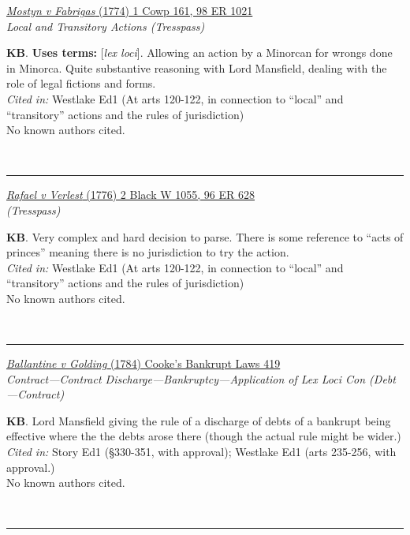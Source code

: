 \documentclass[twoside]{article}
\begin{document}
        \begin{small}
        \begin{center}
        \href{https://heinonline.org/HOL/P?h=hein.engrep/engrf0098&i=1025}{\textit{Mostyn v Fabrigas} (1774) 1 Cowp 161, 98 ER 1021} \label{12} \\ 
\textit{Local and Transitory Actions (Tresspass)}\\
        \end{center}
        \textbf{KB}.  \textbf{Uses terms: }[\textit{lex loci}]. Allowing an action by a Minorcan for wrongs done in Minorca. Quite substantive reasoning with Lord Mansfield, dealing with the role of legal fictions and forms.\\\textit{Cited in: }Westlake Ed1 (At arts 120-122, in connection to “local” and “transitory” actions and the rules of jurisdiction)\\No known authors cited.
        \end{small}\\
        \rule{\textwidth}{0.5pt}
        

        \begin{small}
        \begin{center}
        \href{https://heinonline.org/HOL/P?h=hein.engrep/engrf0096&i=632}{\textit{Rafael v Verlest} (1776) 2 Black W 1055, 96 ER 628} \label{11} \\ 
\textit{ (Tresspass)}\\
        \end{center}
        \textbf{KB}. Very complex and hard decision to parse. There is some reference to “acts of princes” meaning there is no jurisdiction to try the action.\\\textit{Cited in: }Westlake Ed1 (At arts 120-122, in connection to “local” and “transitory” actions and the rules of jurisdiction)\\No known authors cited.
        \end{small}\\
        \rule{\textwidth}{0.5pt}
        

        \begin{small}
        \begin{center}
        \href{https://link.gale.com/apps/doc/CW0125544801/ECCO?u=oxford&sid=gale_marc&xid=19b67222&pg=534}{\textit{Ballantine v Golding} (1784) Cooke’s Bankrupt Laws 419} \label{39} \\ 
\textit{Contract---Contract Discharge---Bankruptcy---Application of Lex Loci Con (Debt---Contract)}\\
        \end{center}
        \textbf{KB}. Lord Mansfield giving the rule of a discharge of debts of a bankrupt being effective where the the debts arose there (though the actual rule might be wider.)\\\textit{Cited in: }Story Ed1 (§330-351, with approval); Westlake Ed1 (arts 235-256, with approval.)\\No known authors cited.
        \end{small}\\
        \rule{\textwidth}{0.5pt}
        
\end{document}

